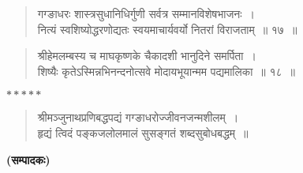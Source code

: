 {\begin{verse}
गग्ङाधरः शास्त्रसुधानिधिर्गुणी सर्वत्र सम्मानविशेषभाजनः~।\\
नित्यं स्वशिष्योद्धरणोद्यतः स्वयमाचार्यवर्यो नितरां विराजताम्~॥ १७~॥
\end{verse}

\begin{verse}
श्रीहेमलम्बस्य च माघकृष्णके चैकादशी भानुदिने समर्पिता~।\\
शिष्यैः कृतेऽस्मिन्नभिनन्दनोत्सवे मोदायभूयान्मम पद्यमालिका~॥ १८~॥
\end{verse}

\centerline{$*****$}

\begin{verse}
श्रीमञ्जुनाथप्रणिबद्धपद्यं गग्ङाधरोज्जीवनजन्मशीलम्~।\\
हृद्यं त्विदं पङ्कजलोलमालं सुसङ्गतं शब्दसुबोधबद्धम्~॥
\end{verse}


\hspace{6cm}\textbf{(सम्पादकः)}

\articleend
}
